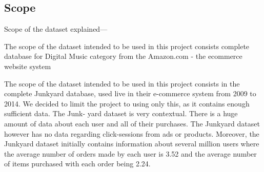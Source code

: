 \subsection{Scope}

Scope of the dataset explained---

The scope of the dataset intended to be used in this project consists complete database for Digital Music category from the Amazon.com - the ecommerce website system


The scope of the dataset intended to be used in this project consists in the complete
Junkyard database, used live in their e-commerce system from 2009 to 2014. We decided
to limit the project to using only this, as it contains enough sufficient data. The Junk-
yard dataset is very contextual. There is a huge amount of data about each user and all
of their purchases. The Junkyard dataset however has no data regarding click-sessions
from ads or products.
Moreover, the Junkyard dataset initially contains information about several million users
where the average number of orders made by each user is 3.52 and the average number
of items purchased with each order being 2.24.


